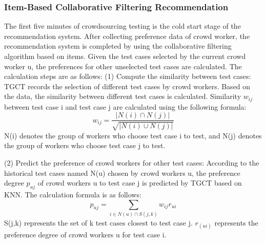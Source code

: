 \subsubsection{Item-Based Collaborative Filtering Recommendation}
The first five minutes of crowdsourcing testing is the cold start stage of the recommendation system. After collecting preference data of crowd worker, the recommendation system is completed by using the collaborative filtering algorithm based on items. Given the test cases selected by the current crowd worker u, the preferences for other unselected test cases are calculated. The calculation steps are as follows: (1) Compute the similarity between test cases: TGCT records the selection of different test cases by crowd workers. Based on the data, the similarity between different test cases is calculated. Similarity $w_{ij}$ between test case i and test case j are calculated using the following formula:
\begin{equation}
w_{ij} = \frac{|N(i) \cap N(j)|}{\sqrt{|N(i) \cup N(j)|}}
\end{equation}
N(i) denotes the group of workers who choose test case i to test, and N(j) denotes the group of workers who choose test case j to test.

(2) Predict the preference of crowd workers for other test cases: According to the historical test cases named N(u) chosen by crowd workers u, the preference degree $p_{uj}$ of crowd workers u to test case j is predicted by TGCT based on KNN. The calculation formula is as follows:
\begin{equation}
p_{uj} = \sum_{i\in N(u) \cap S(j,k)}w_{ij}r_{ui}
\end{equation}
S(j,k) represents the set of k test cases closest to test case j. $r_(ui)$ represents the preference degree of crowd workers u for test case i. 

